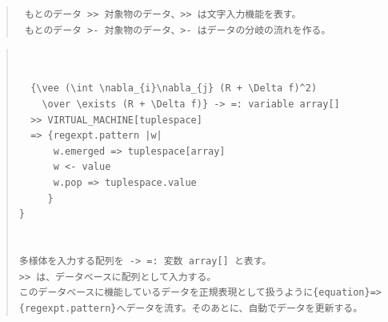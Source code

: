 \documentclass{jsarticle}
\begin{document}
\begin{quote}
\setlength{\baselineskip}{12pt}
\begin{verbatim}
 もとのデータ >> 対象物のデータ、>> は文字入力機能を表す。
 もとのデータ >- 対象物のデータ、>- はデータの分岐の流れを作る。
\end{verbatim}
\end{quote}




\begin{quote}
\setlength{\baselineskip}{12pt}
\begin{verbatim}

 
  {\vee (\int \nabla_{i}\nabla_{j} (R + \Delta f)^2) 
    \over \exists (R + \Delta f)} -> =: variable array[]  
  >> VIRTUAL_MACHINE[tuplespace] 
  => {regexpt.pattern |w|
      w.emerged => tuplespace[array]
      w <- value
      w.pop => tuplespace.value
     }
}


多様体を入力する配列を -> =: 変数 array[] と表す。
>> は、データベースに配列として入力する。
このデータベースに機能しているデータを正規表現として扱うように{equation}=>
{regexpt.pattern}へデータを流す。そのあとに、自動でデータを更新する。
\end{verbatim}
\end{quote}
\end{document}
